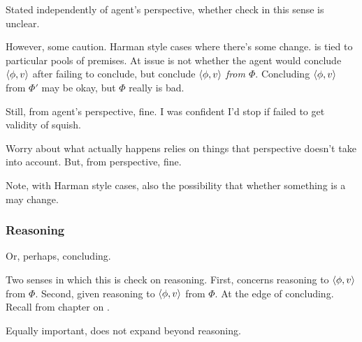 \begin{note}
  Stated independently of agent's perspective, whether check in this sense is unclear.

  However, some caution.
  Harman style cases where there's some change.
  \requ{} is tied to particular pools of premises.
  At issue is not whether the agent would conclude \(\langle \phi, v \rangle\) after failing to conclude, but conclude \(\langle \phi, v \rangle\) \emph{from \(\Phi\)}.
  Concluding \(\langle \phi, v \rangle\) from \(\Phi'\) may be okay, but \(\Phi\) really is bad.

  Still, from agent's perspective, fine.
  I was confident I'd stop if failed to get validity of squish.

  Worry about what actually happens relies on things that perspective doesn't take into account.
  But, from perspective, fine.

  Note, with Harman style cases, also the possibility that whether something is a \requ{} may change.
\end{note}

\subsubsection{Reasoning}

\begin{note}
  Or, perhaps, concluding.
\end{note}

\begin{note}
  Two senses in which this is check on reasoning.
  First, concerns reasoning to \(\langle \phi, v \rangle\) from \(\Phi\).
  Second, given reasoning to \(\langle \phi, v \rangle\) from \(\Phi\).
  At the edge of concluding.
  Recall from chapter on .
\end{note}

\begin{note}
  Equally important, does not expand beyond reasoning.
\end{note}

